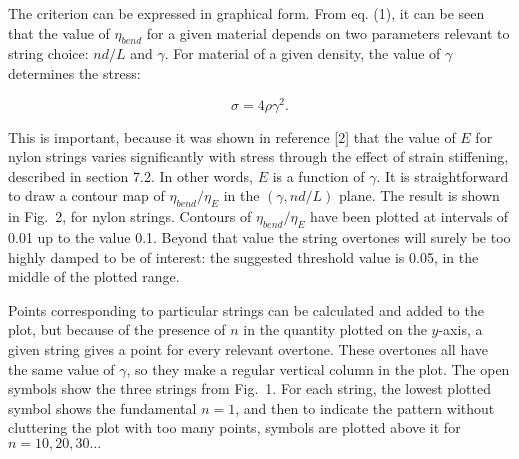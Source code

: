   The criterion can be expressed in graphical form. From eq. (1), it can be 
  seen that the value of $\eta_{bend}$ for a given material depends on two 
  parameters relevant to string choice: $nd/L$ and $\gamma$. For material of a 
  given density, the value of $\gamma$ determines the stress: 

  \begin{equation*}\sigma = 4 \rho \gamma^2. \tag{2}\end{equation*} 

  This is important, because it was shown in reference [2] that the value of 
  $E$ for nylon strings varies significantly with stress through the effect of 
  strain stiffening, described in section 7.2. In other words, $E$ is a 
  function of $\gamma$. It is straightforward to draw a contour map of 
  $\eta_{bend}/\eta_E$ in the $(\gamma, nd/L)$ plane. The result is shown in 
  Fig.\ 2, for nylon strings. Contours of $\eta_{bend}/\eta_E$ have been 
  plotted at intervals of 0.01 up to the value 0.1. Beyond that value the 
  string overtones will surely be too highly damped to be of interest: the 
  suggested threshold value is 0.05, in the middle of the plotted range. 


  Points corresponding to particular strings can be calculated and added to the 
  plot, but because of the presence of $n$ in the quantity plotted on the 
  $y$-axis, a given string gives a point for every relevant overtone. These 
  overtones all have the same value of $\gamma$, so they make a regular 
  vertical column in the plot. The open symbols show the three strings from 
  Fig.\ 1. For each string, the lowest plotted symbol shows the fundamental 
  $n=1$, and then to indicate the pattern without cluttering the plot with too 
  many points, symbols are plotted above it for $n=10, 20, 30...$ 

